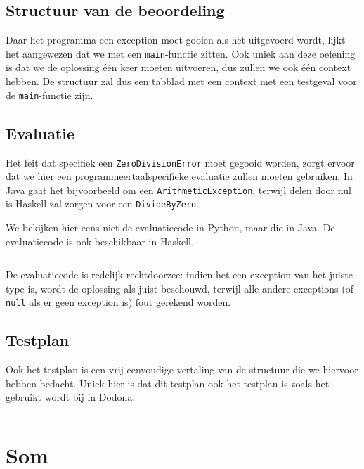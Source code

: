 \subsection{Structuur van de beoordeling}\label{subsec:oefening-zero-structuur}

Daar het programma een exception moet gooien als het uitgevoerd wordt, lijkt het aangewezen dat we met een \texttt{main}-functie zitten.
Ook uniek aan deze oefening is dat we de oplossing één keer moeten uitvoeren, dus zullen we ook één context hebben.
De structuur zal dus een tabblad met een context met een testgeval voor de \texttt{main}-functie zijn.

\subsection{Evaluatie}\label{subsec:oefening-zero-evaluatie}

Het feit dat specifiek een \texttt{ZeroDivisionError} moet gegooid worden, zorgt ervoor dat we hier een programmeertaalspecifieke evaluatie zullen moeten gebruiken.
In Java gaat het bijvoorbeeld om een \texttt{ArithmeticException}, terwijl delen door nul is Haskell zal zorgen voor een \texttt{DivideByZero}.

We bekijken hier eens niet de evaluatiecode in Python, maar die in Java.
De evaluatiecode is ook beschikbaar in Haskell.

\inputminted{java}{sources/division-evaluator.java}

De evaluatiecode is redelijk rechtdoorzee: indien het een exception van het juiste type is, wordt de oplossing als juist beschouwd, terwijl alle andere exceptions (of \texttt{null} als er geen exception is) fout gerekend worden.

\subsection{Testplan}\label{subsec:oefening-zero-testplan}

Ook het testplan is een vrij eenvoudige vertaling van de structuur die we hiervoor hebben bedacht.
Uniek hier is dat dit testplan ook het testplan is zoals het gebruikt wordt bij in Dodona.

\inputminted{json}{sources/division-plan.tson}

\section{Som}\label{sec:oefeningen-som}

